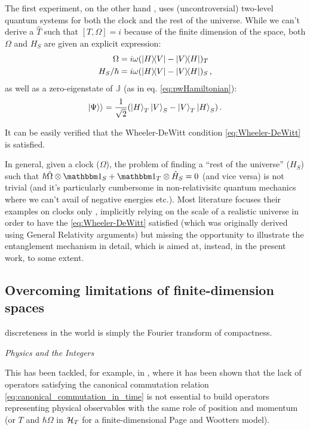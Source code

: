 The first experiment, on the other hand \parencite{Moreva:illustration,Moreva:synthetic},
uses (uncontroversial)
two-level quantum systems for both the clock and the rest of the universe.
While we can't derive a $\hat{T}$ such that $[T, \Omega] = i$
because of the finite dimension of the space, both $\Omega$
and $H_S$ are given an explicit expression:
\begin{align}\label{eq:MorevaOmegaT}
  \Omega            &= i\omega(\ketbra{H}{V}- \ketbra{V}{H})_T \\
  H_S/{\hbar}       &= i\omega(\ketbra{H}{V}- \ketbra{V}{H})_S
  \,\text{,}
\end{align} 
as well as a zero-eigenstate of $\mathbb{J}$ (as in eq. \ref{eq:pwHamiltonian}):
\begin{equation}
  |\Psi\rangle\rangle = \frac{1}{\sqrt{2}}\qty(\ket{H}_T\ket{V}_S-\ket{V}_T\ket{H}_S)
  \,\text{.}
\end{equation}

It can be easily verified that the Wheeler-DeWitt condition
\eqref{eq:Wheeler-DeWitt} is satisfied.

In general, given a clock ($\Omega$), the problem of finding a
``rest of the universe'' ($H_S$) such that
$\hbar\hat{\Omega}\ox\idop_S + \idop_T\ox\hat{H}_S = 0$
(and vice versa)
is not trivial
(and it's particularly cumbersome in non-relativisitc
quantum mechanics where we can't avail of negative energies etc.).
Most literature focuses their examples on clocks only
\parencite{Prvanovic,RealisticClocks,HarmonicClocks},
implicitly relying on the scale of a realistic universe
in order to have the \eqref{eq:Wheeler-DeWitt} satisfied
(which was originally derived using General Relativity arguments)
but missing the opportunity to illustrate the entanglement mechanism in detail,
which is aimed at, instead, in the present work, to some extent.

\subsection{Overcoming limitations of finite-dimension spaces}
\epigraph{\textelp{} discreteness in the world is simply the Fourier transform of compactness.}{
  \emph{Physics and the Integers} \parencite{Tong_Integers}
}%
\noindent{}%
This has been tackled, for example, in \cite{FiniteHilb},
where it has been shown that the lack of operators satisfying the canonical
commutation relation \eqref{eq:canonical_commutation_in_time}
is not essential to build operators representing physical observables
with the same role of position and momentum (or $T$ and $\hbar\Omega$
in $\mathcal{H}_T$ for a finite-dimensional Page and Wootters model).

